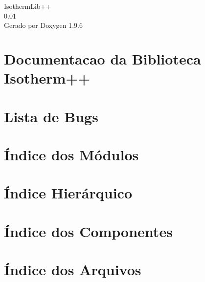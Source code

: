 \documentclass[twoside]{book}
\newcommand{\+}{\discretionary{\mbox{\scriptsize$\hookleftarrow$}}{}{}}
\newcommand{\clearemptydoublepage}{%
    \newpage{\pagestyle{empty}\cleardoublepage}%
  }
\begin{document}
  \raggedbottom
    \hypersetup{pageanchor=false,
                bookmarksnumbered=true,
                pdfencoding=unicode
               }
  \begin{titlepage}
  \vspace*{7cm}
  \begin{center}%
  {\Large Isotherm\+Lib++}\\
  [1ex]\large 0.\+01 \\
  \vspace*{1cm}
  {\large Gerado por Doxygen 1.9.6}\\
  \end{center}
  \end{titlepage}
  \clearemptydoublepage
  \tableofcontents
  \clearemptydoublepage
  \hypersetup{pageanchor=true}
\chapter{Documentacao da Biblioteca Isotherm++}
\label{index}\hypertarget{index}{}
\chapter{Lista de Bugs}
\label{bug}

\chapter{Índice dos Módulos}

\chapter{Índice Hierárquico}

\chapter{Índice dos Componentes}

\chapter{Índice dos Arquivos}

\end{document}
